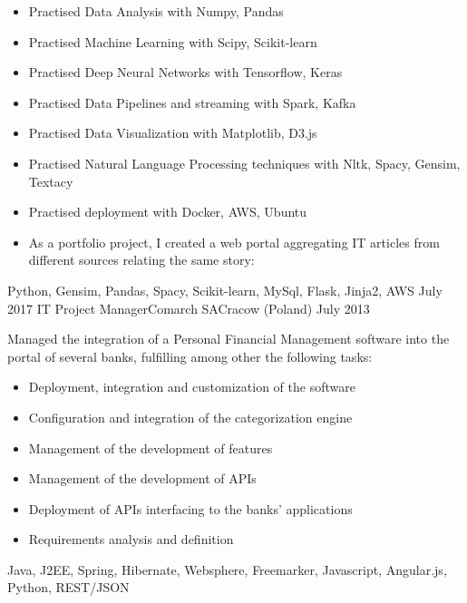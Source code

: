 \begin{experiences}
{                      \begin{itemize}
                      \item Practised Data Analysis with Numpy, Pandas
                      \item Practised Machine Learning with Scipy, Scikit-learn
					   \item Practised Deep Neural Networks with Tensorflow, Keras
					   \item Practised Data Pipelines and streaming with Spark, Kafka
					   \item Practised Data Visualization with Matplotlib, D3.js
					   \item Practised Natural Language Processing techniques with Nltk, Spacy, Gensim, Textacy
					   \item Practised deployment with Docker, AWS, Ubuntu
					   \item As a portfolio project, I created a web portal aggregating IT articles from different sources relating the same story: 
                      \end{itemize}
                    }
                    {Python, Gensim, Pandas, Spacy, Scikit-learn, MySql, Flask, Jinja2, AWS}
  \emptySeparator
  \experience
    {July 2017} {IT Project Manager}{Comarch SA}{Cracow (Poland)}
    {July 2013} {Managed the integration of a Personal Financial Management software into the portal of several banks, fulfilling among other the following tasks:
       			 \begin{itemize}
                        \item Deployment, integration and customization of the software
                        \item Configuration and integration of the categorization engine                        
                        \item Management of the development of features 
                        \item Management of the development of APIs
                        \item Deployment of APIs interfacing to the banks' applications 
                        \item Requirements analysis and definition                                                
                      \end{itemize}
                    }
                    {Java, J2EE, Spring, Hibernate, Websphere, Freemarker, Javascript, Angular.js, Python, REST/JSON}

\end{experiences}
